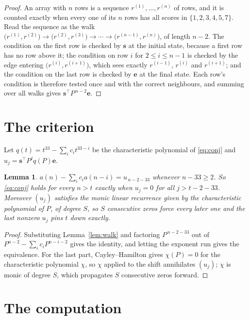 \documentclass[11pt,a4paper]{article}
\theoremstyle{plain}
\newtheorem{lemma}[theorem]{Lemma}
\theoremstyle{definition}
\begin{document}
\begin{proof}
An array with $n$ rows is a sequence $r^{(1)},\dots,r^{(n)}$ of rows, and it is counted
exactly when every one of its $n$ rows has all scores in $\{1,2,3,4,5,7\}$. Read the sequence as the
walk $\bigl(r^{(1)},r^{(2)}\bigr)\to\bigl(r^{(2)},r^{(3)}\bigr)\to\cdots\to
\bigl(r^{(n-1)},r^{(n)}\bigr)$, of length $n-2$. The condition on the first row is
checked by $\mathbf{s}$ at the initial state, because a first row has no row above it; the
condition on row $i$ for $2\le i\le n-1$ is checked by the edge entering
$\bigl(r^{(i)},r^{(i+1)}\bigr)$, which sees exactly $r^{(i-1)}$, $r^{(i)}$ and
$r^{(i+1)}$; and the condition on the last row is checked by $\mathbf{e}$ at the final
state. Each row's condition is therefore tested once and with the correct neighbours, and
summing over all walks gives $\mathbf{s}^{\!\top}P^{\,n-2}\mathbf{e}$.
\end{proof}

\section{The criterion}

Let $q(t)=t^{33}-\sum_i c_i t^{33-i}$ be the characteristic polynomial of
\eqref{eq:conj} and $u_j=\mathbf{s}^{\!\top}P^{j}q(P)\mathbf{e}$.

\begin{lemma}\label{lem:crit}
$a(n)-\sum_i c_i a(n-i)=u_{\,n-2-33}$ whenever $n-33\ge2$. So \eqref{eq:conj}
holds for every $n>t$ exactly when $u_j=0$ for all $j>t-2-33$. Moreover $(u_j)$
satisfies the monic linear recurrence given by the characteristic polynomial of $P$, of
degree $S$, so $S$ consecutive zeros force every later one and the last nonzero $u_j$ pins
$t$ down exactly.
\end{lemma}

\begin{proof}
Substituting Lemma~\ref{lem:walk} and factoring $P^{\,n-2-33}$ out of
$P^{n-2}-\sum_i c_i P^{n-i-2}$ gives the identity, and letting the exponent run gives the
equivalence. For the last part, Cayley--Hamilton gives $\chi(P)=0$ for the characteristic
polynomial $\chi$, so $\chi$ applied to the shift annihilates $(u_j)$; $\chi$ is monic of
degree $S$, which propagates $S$ consecutive zeros forward.
\end{proof}

\section{The computation}
\end{document}
